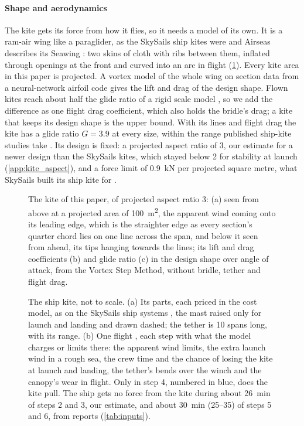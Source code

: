 \paragraph{Shape and aerodynamics} The kite gets its force from how it flies, so it needs a model of its own. It is a ram-air wing like a paraglider, as the SkySails ship kites were \citep{skysails2018} and Airseas describes its Seawing \citep{airseas_seawing_web}: two skins of cloth with ribs between them, inflated through openings at the front and curved into an arc in flight (\cref{fig:kite}). Every kite area in this paper is projected. A vortex model of the whole wing \citep{cayon2023} on section data from a neural-network airfoil code \citep{sharpe2025} gives the lift and drag of the design shape. Flown kites reach about half the glide ratio of a rigid scale model \citep{poland2025,oehler2019,erhard2013b,paulig2013}, so we add the difference as one flight drag coefficient, which also holds the bridle's drag; a kite that keeps its design shape is the upper bound. With its lines and flight drag the kite has a glide ratio $G=3.9$ at every size, within the range published ship-kite studies take \citep{traut2014,cedelft2016,podeur2016}. Its design is fixed: a projected aspect ratio of 3, our estimate for a newer design than the SkySails kites, which stayed below 2 for stability at launch \citep{paulig2013} (\cref{app:kite_aspect}), and a force limit of \SI{0.9}{kN} per projected square metre, what SkySails built its ship kite for \citep{paulig2013,folkersma2020}.

\begin{figure}[tbp]
\centering
{}
\caption{The kite of this paper, of projected aspect ratio 3: (a) seen from above at a projected area of \SI{100}{m^2}, the apparent wind coming onto its leading edge, which is the straighter edge as every section's quarter chord lies on one line across the span, and below it seen from ahead, its tips hanging towards the lines; its lift and drag coefficients (b) and glide ratio (c) in the design shape over angle of attack, from the Vortex Step Method, without bridle, tether and flight drag.}
\label{fig:kite}
\end{figure}

\begin{figure}[tbp]
\centering

\caption{The ship kite, not to scale. (a) Its parts, each priced in the cost model, as on the SkySails ship systems \citep{fritz2013}, the mast raised only for launch and landing and drawn dashed; the tether is 10 spans long, with its range. (b) One flight \citep{fritz2013}, each step with what the model charges or limits there: the apparent wind limits, the extra launch wind in a rough sea, the crew time and the chance of losing the kite at launch and landing, the tether's bends over the winch and the canopy's wear in flight. Only in step 4, numbered in blue, does the kite pull. The ship gets no force from the kite during about \SI{26}{min} of steps 2 and 3, our estimate, and about \SI{30}{min} (25--35) of steps 5 and 6, from reports (\cref{tab:inputs}).}
\label{fig:kite_system}
\end{figure}

